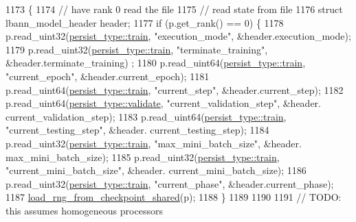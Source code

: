 \begin{DoxyCode}
1173                                                   \{
1174   \textcolor{comment}{// have rank 0 read the file}
1175   \textcolor{comment}{// read state from file}
1176   \textcolor{keyword}{struct }lbann\_model\_header header;
1177   \textcolor{keywordflow}{if} (p.get\_rank() == 0) \{
1178     p.read\_uint32(\hyperlink{namespacelbann_adee41f31f15f3906cbdcce4a1417eb56a61b3a8faa9c1091806675c230a9abe64}{persist\_type::train}, \textcolor{stringliteral}{"execution\_mode"},     &header.execution\_mode);
1179     p.read\_uint32(\hyperlink{namespacelbann_adee41f31f15f3906cbdcce4a1417eb56a61b3a8faa9c1091806675c230a9abe64}{persist\_type::train}, \textcolor{stringliteral}{"terminate\_training"}, &header.terminate\_training)
      ;
1180     p.read\_uint64(\hyperlink{namespacelbann_adee41f31f15f3906cbdcce4a1417eb56a61b3a8faa9c1091806675c230a9abe64}{persist\_type::train}, \textcolor{stringliteral}{"current\_epoch"},      &header.current\_epoch);
1181     p.read\_uint64(\hyperlink{namespacelbann_adee41f31f15f3906cbdcce4a1417eb56a61b3a8faa9c1091806675c230a9abe64}{persist\_type::train}, \textcolor{stringliteral}{"current\_step"},       &header.current\_step);
1182     p.read\_uint64(\hyperlink{namespacelbann_adee41f31f15f3906cbdcce4a1417eb56af9ab05454998236921a6b0e281fae632}{persist\_type::validate}, \textcolor{stringliteral}{"current\_validation\_step"},       &header.
      current\_validation\_step);
1183     p.read\_uint64(\hyperlink{namespacelbann_adee41f31f15f3906cbdcce4a1417eb56a61b3a8faa9c1091806675c230a9abe64}{persist\_type::train}, \textcolor{stringliteral}{"current\_testing\_step"},       &header.
      current\_testing\_step);
1184     p.read\_uint32(\hyperlink{namespacelbann_adee41f31f15f3906cbdcce4a1417eb56a61b3a8faa9c1091806675c230a9abe64}{persist\_type::train}, \textcolor{stringliteral}{"max\_mini\_batch\_size"},      &header.
      max\_mini\_batch\_size);
1185     p.read\_uint32(\hyperlink{namespacelbann_adee41f31f15f3906cbdcce4a1417eb56a61b3a8faa9c1091806675c230a9abe64}{persist\_type::train}, \textcolor{stringliteral}{"current\_mini\_batch\_size"},      &header.
      current\_mini\_batch\_size);
1186     p.read\_uint32(\hyperlink{namespacelbann_adee41f31f15f3906cbdcce4a1417eb56a61b3a8faa9c1091806675c230a9abe64}{persist\_type::train}, \textcolor{stringliteral}{"current\_phase"},      &header.current\_phase);
1187     \hyperlink{namespacelbann_ab76114a0e8cc90c28bcb9e7d01eec89a}{load\_rng\_from\_checkpoint\_shared}(p);
1188   \}
1189   
1190 
1191   \textcolor{comment}{// TODO: this assumes homogeneous processors}

\end{DoxyCode}
